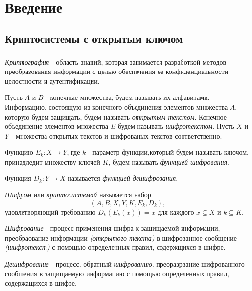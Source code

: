 
\newpage
\chapter*{Введение}

\section*{Криптосистемы с открытым ключом}
\paragraph{} \textit{Криптография} - область знаний, которая занимается разработкой методов преобразования информации с целью обеспечения ее 
конфиденциальности, целостности и аутентификации.

  Пусть $A$ и $B$  - конечные множества, будем называть их алфавитами. Информацию, состоящую из конечного объединения элементов 
множества $A$, которую будем защищать, будем называть \textit{открытым текстом}. Конечное объединение элементов множества $B$ будем 
называть \textit{шифротекстом}. Пусть $X$ и $Y$ - множества открытых текстов и шифрованых текстов соответственно.

  Функцию $E_{k} : X \rightarrow Y$, где $k$ - параметр функции,который будем называть ключом, 
принадледит множеству ключей $K$, будем называть \textit{функцией шифрования}. 

  Функция $D_{k} : Y \rightarrow X$ называется \textit{функцией дешифрования}.

  \textit{Шифром} или \textit{криптосистемой} называется набор 
  \begin{equation}
    (A, B, X, Y, K, E_{k}, D_{k}),
  \end{equation}
  удовлетворяющий требованию $D_{k}(E_{k}(x)) = x$ для каждого $x \subseteq X$ и $k \subseteq K$.

  \textit{Шифрование} - процесс применения шифра к защищаемой информации, преобраование информации \textit{(открытого текста)} в шифрованное сообщение \textit{(шифротекст)} с помощью определенных правил, содержщихся в шифре.

  \textit{Дешифрование} - процесс, обратный \textit{шифрованию}, преоразрвание шифрованного сообщения в защищаемую информацию с помощью определенных 
правил, содержащихся в шифре.

